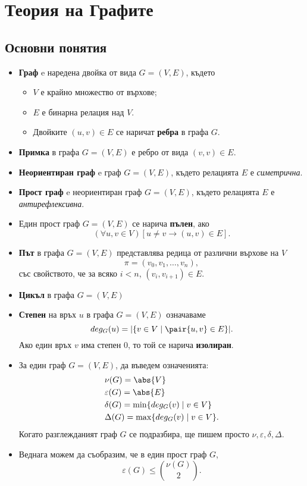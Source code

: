 \chapter{Теория на Графите}

\section{Основни понятия}

\begin{itemize}
\item
  {\bf Граф} e наредена двойка от вида $G = (V,E)$, 
  където
  \begin{itemize}
  \item 
    $V$ е крайно множество от върхове;
  \item
    $E$ е бинарна релация над $V$.
  \item
    Двойките $(u,v) \in E$ се наричат {\bf ребра} в графа $G$.
  \end{itemize}
\item
  {\bf Примка} в графа $G = (V,E)$ е ребро от вида $(v,v) \in E$.
\item
  {\bf Неориентиран граф} e граф $G = (V,E)$, 
  където релацията $E$ е {\em симетрична}.
\item
  {\bf Прост граф} e неориентиран граф $G = (V,E)$,
  където релацията $E$ е {\em антирефлексивна}.
\item
  Един прост граф $G = (V,E)$ се нарича {\bf пълен}, ако
  \[(\forall u,v\in V)[u \neq v \to (u,v) \in E].\]
\item
  {\bf Път} в графа $G = (V,E)$ представлява редица от различни върхове на $V$
  \[\pi = (v_0,v_1,\dots,v_{n}),\]
  със свойството, че за всяко $i < n$,
  $(v_i,v_{i+1}) \in E$.
\item
  {\bf Цикъл} в графа $G = (V,E)$
\item
  {\bf Степен} на връх $u$ в графа $G = (V,E)$ означаваме
  \[deg_G(u) = |\{v \in V \mid \pair{u,v} \in E\}|.\]
  Ако един връх $v$ има степен $0$, то той се нарича {\bf изолиран}.
\item
  За един граф $G = (V,E)$, да въведем означенията:
  \begin{align*}
    & \nu(G) = \abs{V}\\
    & \varepsilon(G) = \abs{E}\\
    & \delta(G) = \min\{deg_G(v) \mid v \in V\}\\
    & \Delta(G) = \max\{deg_G(v) \mid v \in V\}.
  \end{align*}
  Когато разглежданият граф $G$ се подразбира, ще пишем просто $\nu, \varepsilon, \delta, \Delta$.
\item
  Веднага можем да съобразим, че в един прост граф $G$,
  \[\varepsilon(G) \leq \binom{\nu(G)}{2}.\]
\end{itemize}

